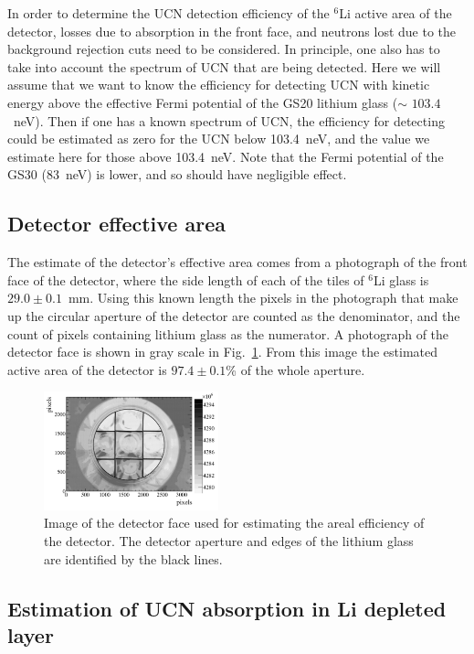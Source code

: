 \documentclass[twocolumn]{bmcart}
\begin{document}
In order to determine the UCN detection efficiency of the $^{6}$Li
active area of the detector, losses due to absorption in the front
face, and neutrons lost due to the background rejection cuts need to
be considered.  In principle, one also has to take into account the
spectrum of UCN that are being detected.  Here we will assume that we
want to know the efficiency for detecting UCN with kinetic energy
above the effective Fermi potential of the GS20 lithium glass ($\sim$
$103.4$~neV).  Then if one has a known spectrum of UCN, the efficiency
for detecting could be estimated as zero for the UCN below 103.4~neV,
and the value we estimate here for those above 103.4~neV.  Note that
the Fermi potential of the GS30 (83~neV) is lower, and so should have
negligible effect.


\subsection{ Detector effective area }

The estimate of the detector's effective area comes from a photograph
of the front face of the detector, where the side length of each of
the tiles of $^6$Li glass is $29.0\pm0.1$~mm.  Using this known length
the pixels in the photograph that make up the circular aperture of the
detector are counted as the denominator, and the count of pixels
containing lithium glass as the numerator.  A photograph of the
detector face is shown in gray scale in Fig.~\ref{fig:detface}.  From
this image the estimated active area of the detector is $97.4\pm0.1$\%
of the whole aperture.

\begin{figure}[!htpb]
\centering \includegraphics[width = 0.45\textwidth]{figures/detface.pdf}
\caption{Image of the detector face used for estimating the
  areal efficiency of the detector.  The detector aperture and edges
  of the lithium glass are identified by the black lines.}
\label{fig:detface}
\end{figure}

\subsection{ Estimation of UCN absorption in Li depleted layer }
\end{document}
